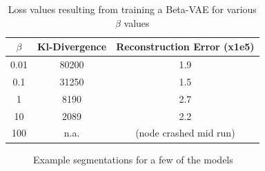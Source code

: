\begin{table}[!ht]
    \centering
    \caption{Loss values resulting from training a Beta-VAE for various $\beta$ values}
    \label{tab:vae-backbones}
    \begin{tabular}{ccc}
        \hline
        $\beta$ & Kl-Divergence & Reconstruction Error (x1e5) \\
        \hline
        0.01    & 80200         & 1.9                         \\
        0.1     & 31250         & 1.5                         \\
        1       & 8190          & 2.7                         \\
        10      & 2089          & 2.2                         \\
        100     & n.a.          & (node crashed mid run)      \\
        \hline
    \end{tabular}
\end{table}

\begin{figure}[!ht]
    \centering
    \caption{Example segmentations for a few of the models}
    \label{fig:vae-backbones}
     \quad
\end{figure}


